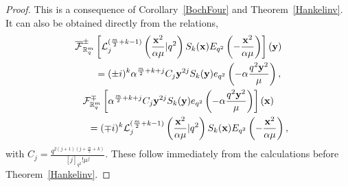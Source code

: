 \documentclass[11pt]{article}
\newcommand{\mR}{\mathbb{R}}
\newcommand{\cF}{\mathcal{F}}
\newcommand{\cL}{\mathcal{L}}
\numberwithin{equation}{section}
\begin{document}
\begin{proof}
This is a consequence of Corollary~\ref{BochFour} and Theorem~\ref{Hankelinv}. It can also be obtained directly from the relations,
\begin{gather*}
\overline{\cF}^{\pm}_{\mR^m_q}\left[\cL_j^{(\frac{m}{2}+k-1)}\left(\frac{\bold{x}^2}{\alpha\mu}|q^2\right)
S_k(\bold{x})E_{q^2}\left(-\frac{\bold{x}^2}{\alpha\mu}\right)\right](\bold{y})\\
 \qquad{} = (\pm i)^k\alpha^{\frac{m}{2}+k+j}C_j\bold{y}^{2j}S_k(\bold{y})e_{q^2}\left(-\alpha\frac{q^2\bold{y}^2}{\mu}\right),\\
\cF^{\mp}_{\mR^m_q}\left[\alpha^{\frac{m}{2}+k+j}C_j\bold{y}^{2j}S_k(\bold{y})e_{q^2}\left(-\alpha\frac{q^2\bold{y}^2}{\mu}\right)\right](\bold{x})\\
 \qquad{} = (\mp i)^k\cL_j^{(\frac{m}{2}+k-1)}\left(\frac{\bold{x}^2}{\alpha\mu}|q^2\right)S_k(\bold{x})E_{q^2}\left(-\frac{\bold{x}^2}{\alpha\mu}\right),
\end{gather*}
with $C_j=\frac{q^{2(j+1)(j+\frac{m}{2}+k)}}{[j]_{q^2}!\mu^j}$. These follow immediately from the calculations before Theorem~\ref{Hankelinv}.
\end{proof}
\end{document}
